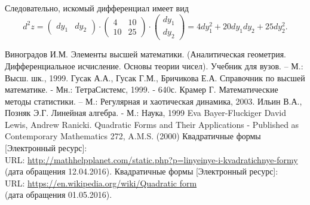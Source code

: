 \documentclass[bachelor, och, coursework, times]{SCWorks}
\begin{document}
Следовательно, искомый дифференциал имеет вид
$$d^2z=
\begin{pmatrix}
dy_1&dy_2
\end{pmatrix}\!\cdot\! 
\begin{pmatrix}
4&10\\
10&25 
\end{pmatrix}\!\cdot\! 
\begin{pmatrix}dy_1\\dy_2\end{pmatrix}= 4dy_1^2+20dy_1dy_2+25dy_2^2.$$

\begin{thebibliography}{00} %
Виноградов И.М. Элементы высшей математики. (Аналитическая геометрия. Дифференциальное исчисление. Основы теории чисел). Учебник для вузов. – М.: Высш. шк., 1999.
Гусак А.А., Гусак Г.М., Бричикова Е.А. Справочник по высшей математике. - Мн.: ТетраСистемс, 1999. - 640с. 
Крамер Г. Математические методы статистики. – М.: Регулярная и хаотическая динамика, 2003. 
Ильин В.А., Позняк Э.Г. Линейная алгебра. - М.: Наука, 1999
Eva Bayer-Fluckiger David Lewis, Andrew Ranicki. Quadratic Forms and Their Applications - Published as Contemporary Mathematics 272, A.M.S. (2000)
Квадратичные формы [Электронный ресурс]:\\
URL: \href{http://mathhelpplanet.com/static.php?p=linyeinye-i-kvadratichnye-formy}{http://mathhelpplanet.com/static.php?p=linyeinye-i-kvadratichnye-formy} (дата обращения 12.04.2016).
Квадратичные формы [Электронный ресурс]:\\
URL: \href{https://en.wikipedia.org/wiki/Quadratic\underline{ }form}{https://en.wikipedia.org/wiki/Quadratic\underline{ }form} \\ (дата обращения 01.05.2016).

\end{thebibliography}
\end{document}
